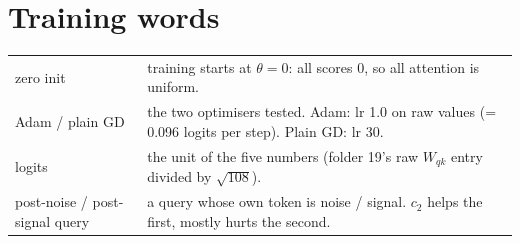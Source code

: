 \documentclass[11pt]{article}
\newcommand{\1}{\mathbf{1}}
\begin{document}
\section{Training words}
\begin{center}
\begin{tabular}{>{\raggedright}p{2.6cm}p{11.8cm}}
\toprule
zero init & training starts at $\theta=0$: all scores 0, so all attention is uniform.\\
Adam / plain GD & the two optimisers tested. Adam: lr 1.0 on raw values (= 0.096 logits per step). Plain GD: lr 30.\\
logits & the unit of the five numbers (folder 19's raw $W_{qk}$ entry divided by $\sqrt{108}$).\\
post-noise / post-signal query & a query whose own token is noise / signal. $c_2$ helps the first, mostly hurts the second.\\
\bottomrule
\end{tabular}
\end{center}
\end{document}
